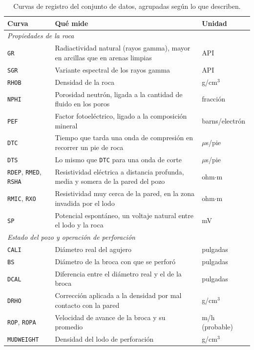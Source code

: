 \documentclass[11pt,a4paper]{article}
\begin{document}
\begin{table}[htbp]
\centering
\small
\caption{Curvas de registro del conjunto de datos, agrupadas según lo que describen.}
\label{tab:curvas}
\begin{tabular}{lp{8.2cm}l}
\toprule
\textbf{Curva} & \textbf{Qué mide} & \textbf{Unidad} \\
\midrule
\multicolumn{3}{l}{\emph{Propiedades de la roca}} \\
\texttt{GR} & Radiactividad natural (rayos gamma), mayor en arcillas que en arenas limpias & API \\
\texttt{SGR} & Variante espectral de los rayos gamma & API \\
\texttt{RHOB} & Densidad de la roca & g/cm$^3$ \\
\texttt{NPHI} & Porosidad neutrón, ligada a la cantidad de fluido en los poros & fracción \\
\texttt{PEF} & Factor fotoeléctrico, ligado a la composición mineral & barns/electrón \\
\texttt{DTC} & Tiempo que tarda una onda de compresión en recorrer un pie de roca & $\mu$s/pie \\
\texttt{DTS} & Lo mismo que \texttt{DTC} para una onda de corte & $\mu$s/pie \\
\texttt{RDEP}, \texttt{RMED}, \texttt{RSHA} & Resistividad eléctrica a distancia profunda, media y somera de la pared del pozo & ohm$\cdot$m \\
\texttt{RMIC}, \texttt{RXO} & Resistividad muy cerca de la pared, en la zona invadida por el lodo & ohm$\cdot$m \\
\texttt{SP} & Potencial espontáneo, un voltaje natural entre el lodo y la roca & mV \\
\midrule
\multicolumn{3}{l}{\emph{Estado del pozo y operación de perforación}} \\
\texttt{CALI} & Diámetro real del agujero & pulgadas \\
\texttt{BS} & Diámetro de la broca con que se perforó & pulgadas \\
\texttt{DCAL} & Diferencia entre el diámetro real y el de la broca & pulgadas \\
\texttt{DRHO} & Corrección aplicada a la densidad por mal contacto con la pared & g/cm$^3$ \\
\texttt{ROP}, \texttt{ROPA} & Velocidad de avance de la broca y su promedio & m/h (probable) \\
\texttt{MUDWEIGHT} & Densidad del lodo de perforación & g/cm$^3$ \\
\bottomrule
\end{tabular}
\end{table}
\end{document}
